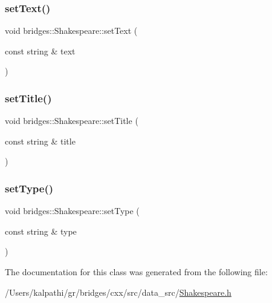 \mbox{\label{classbridges_1_1_shakespeare_a220546925748e67c238411f1ee04d393}} 
\subsubsection{\texorpdfstring{setText()}{setText()}}
{\footnotesize\ttfamily void bridges\+::\+Shakespeare\+::set\+Text (\begin{DoxyParamCaption}\item[{const string \&}]{text }\end{DoxyParamCaption})\hspace{0.3cm}{\ttfamily [inline]}}

\mbox{\label{classbridges_1_1_shakespeare_ad68bee03f37d3fae7ffa4c75946a6dfd}} 
\subsubsection{\texorpdfstring{setTitle()}{setTitle()}}
{\footnotesize\ttfamily void bridges\+::\+Shakespeare\+::set\+Title (\begin{DoxyParamCaption}\item[{const string \&}]{title }\end{DoxyParamCaption})\hspace{0.3cm}{\ttfamily [inline]}}

\mbox{\label{classbridges_1_1_shakespeare_a683816de184cf1e999552e82bcbefa21}} 
\subsubsection{\texorpdfstring{setType()}{setType()}}
{\footnotesize\ttfamily void bridges\+::\+Shakespeare\+::set\+Type (\begin{DoxyParamCaption}\item[{const string \&}]{type }\end{DoxyParamCaption})\hspace{0.3cm}{\ttfamily [inline]}}



The documentation for this class was generated from the following file\+:\begin{DoxyCompactItemize}
\item 
/\+Users/kalpathi/gr/bridges/cxx/src/data\+\_\+src/\mbox{\hyperlink{_shakespeare_8h}{Shakespeare.\+h}}\end{DoxyCompactItemize}

